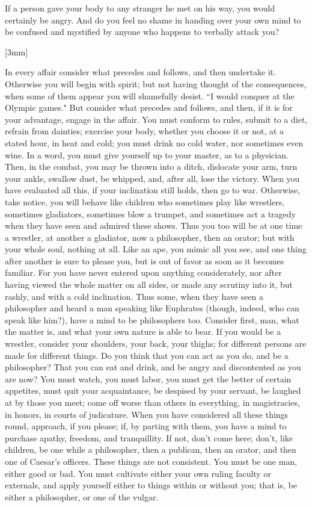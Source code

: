 \documentclass[imperial,twoside,12pt]{octavo}
\newcounter{original_page_count}
\newcommand{\marginticker}{
    \stepcounter{original_page_count}
    \marginnote{
        \color{red}
        \small{
            \roman{original_page_count}
        }
    }[3mm]
}
\begin{document}
If a person gave your body to any stranger he met on his way,
you would certainly be angry. And do you feel no shame in handing
over your own mind to be confused and mystified by anyone who happens
to verbally attack you? 

\marginticker{}

In every affair consider what precedes and follows, and then undertake
it. Otherwise you will begin with spirit; but not having thought of
the consequences, when some of them appear you will shamefully desist.
``I would conquer at the Olympic games." But consider what precedes
and follows, and then, if it is for your advantage, engage in the
affair. You must conform to rules, submit to a diet, refrain from
dainties; exercise your body, whether you choose it or not, at a stated
hour, in heat and cold; you must drink no cold water, nor sometimes
even wine. In a word, you must give yourself up to your master, as
to a physician. Then, in the combat, you may be thrown into a ditch,
dislocate your arm, turn your ankle, swallow dust, be whipped, and,
after all, lose the victory. When you have evaluated all this, if
your inclination still holds, then go to war. Otherwise, take notice,
you will behave like children who sometimes play like wrestlers, sometimes
gladiators, sometimes blow a trumpet, and sometimes act a tragedy
when they have seen and admired these shows. Thus you too will be
at one time a wrestler, at another a gladiator, now a philosopher,
then an orator; but with your whole soul, nothing at all. Like an
ape, you mimic all you see, and one thing after another is sure to
please you, but is out of favor as soon as it becomes familiar. For
you have never entered upon anything considerately, nor after having
viewed the whole matter on all sides, or made any scrutiny into it,
but rashly, and with a cold inclination. Thus some, when they have
seen a philosopher and heard a man speaking like Euphrates (though,
indeed, who can speak like him?), have a mind to be philosophers too.
Consider first, man, what the matter is, and what your own nature
is able to bear. If you would be a wrestler, consider your shoulders,
your back, your thighs; for different persons are made for different
things. Do you think that you can act as you do, and be a philosopher?
That you can eat and drink, and be angry and discontented as you are
now? You must watch, you must labor, you must get the better of certain
appetites, must quit your acquaintance, be despised by your servant,
be laughed at by those you meet; come off worse than others in everything,
in magistracies, in honors, in courts of judicature. When you have
considered all these things round, approach, if you please; if, by
parting with them, you have a mind to purchase apathy, freedom, and
tranquillity. If not, don't come here; don't, like children, be one
while a philosopher, then a publican, then an orator, and then one
of Caesar's officers. These things are not consistent. You must be
one man, either good or bad. You must cultivate either your own ruling
faculty or externals, and apply yourself either to things within or
without you; that is, be either a philosopher, or one of the vulgar.
\end{document}
